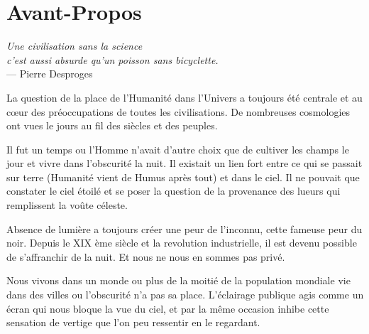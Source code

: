 
\chapter*{Avant-Propos}

\begin{flushright}{\slshape    
	Une civilisation sans la science \\
	c'est aussi absurde qu'un poisson sans bicyclette.} \\ \medskip 
	--- Pierre Desproges
\end{flushright}

\vspace{0.5cm}

La question de la place de l'Humanité dans l'Univers a toujours été centrale et au cœur des préoccupations de toutes les civilisations.
De nombreuses cosmologies ont vues le jours au fil des siècles et des peuples.


Il fut un temps ou l'Homme n'avait d'autre choix que de cultiver les champs le jour et vivre dans l'obscurité la nuit.
Il existait un lien fort entre ce qui se passait sur terre (Humanité vient de Humus après tout) et dans le ciel.
Il ne pouvait que constater le ciel étoilé et se poser la question de la provenance des lueurs qui remplissent la voûte céleste.

Absence de lumière a toujours créer une peur de l'inconnu, cette fameuse peur du noir.
Depuis le XIX ème siècle et la revolution industrielle, il est devenu possible de s'affranchir de la nuit.
Et nous ne nous en sommes pas privé.

Nous vivons dans un monde ou plus de la moitié de la population mondiale vie dans des villes ou l'obscurité n'a pas sa place.
L’éclairage publique agis comme un écran qui nous bloque la vue du ciel, et par la même occasion inhibe cette sensation de vertige que l'on peu ressentir en le regardant.

